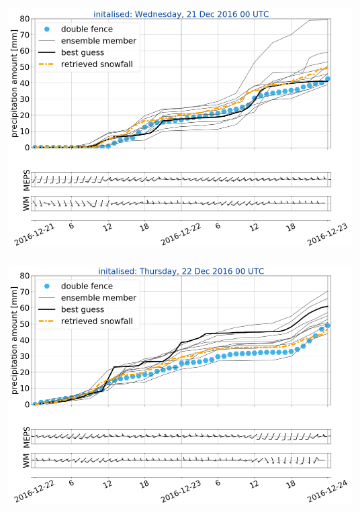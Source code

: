 	\begin{figure}[h!]
		\centering
		\begin{subfigure}[b]{0.49\textwidth}
			\includegraphics[width=\textwidth]{./fig_sfc_acc/acc_wind_20161221_00}
			\caption{}\label{fig:sfc_acc21}
		\end{subfigure}
		\begin{subfigure}[b]{0.49\textwidth}
			\includegraphics[width=\textwidth]{./fig_sfc_acc/acc_wind_20161222_00}
			\caption{}\label{fig:sfc_acc22}
		\end{subfigure}
	\end{figure}
